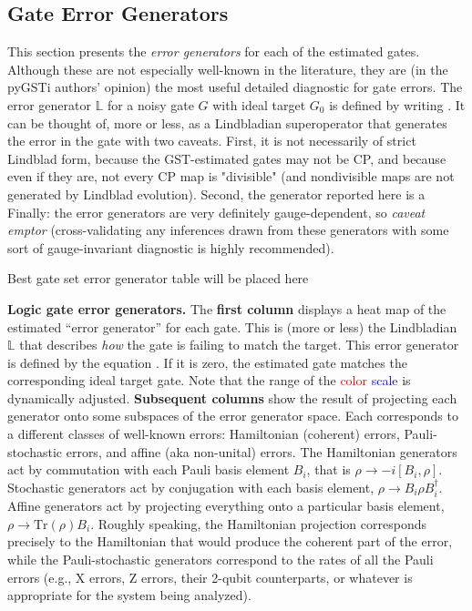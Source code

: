 \documentclass{article}[11pt]
\newcommand{\putfield}[2]{#2}
\begin{document}
{\subsection{Gate Error Generators}
This section presents the \emph{error generators} for each of the estimated gates.  Although these are not especially well-known in the literature, they are (in the pyGSTi authors' opinion) the most useful detailed diagnostic for gate errors.  The error generator $\mathbb{L}$ for a noisy gate $G$ with ideal target $G_0$ is defined by writing \errorgenformula.  It can be thought of, more or less, as a Lindbladian superoperator that generates the error in the gate \textendash with two caveats.  First, it is not necessarily of strict Lindblad form, because the GST-estimated gates may not be CP, and because even if they are, not every CP map is "divisible" (and nondivisible maps are not generated by Lindblad evolution).  Second, the generator reported here is a \errorgendescription  Finally:  the error generators are very definitely gauge-dependent, so \emph{caveat emptor} (cross-validating any inferences drawn from these generators with some sort of gauge-invariant diagnostic is highly recommended).

\begin{table}[h]
  \begin{center}
    \begin{adjustbox}{max width=\textwidth}
      \putfield{final_model_errorgen_box_table}{Best gate set error generator table will be placed here}
    \end{adjustbox}
    \caption{\textbf{Logic gate error generators.} The \textbf{first column} displays a heat map of the estimated ``error generator'' for each gate.  This is (more or less) the Lindbladian $\mathbb{L}$ that describes \emph{how} the gate is failing to match the target.  This error generator is defined by the equation \errorgenformula. If it is zero, the estimated gate matches the corresponding ideal target gate.  Note that the range of the \textcolor{red}{color} \textcolor{blue}{scale} is dynamically adjusted. \textbf{Subsequent columns} show the result of projecting each generator onto some subspaces of the error generator space.  Each corresponds to a different classes of well-known errors:  Hamiltonian (coherent) errors, Pauli-stochastic errors, and affine (aka non-unital) errors.  The Hamiltonian generators act by commutation with each Pauli basis element $B_i$, that is $\rho \rightarrow -i[B_i, \rho]$.  Stochastic generators act by conjugation with each basis element, $\rho \rightarrow B_i \rho B_i^\dagger$.  Affine generators act by projecting everything onto a particular basis element, $\rho \rightarrow \mathrm{Tr}(\rho) B_i$.  Roughly speaking, the Hamiltonian projection corresponds precisely to the Hamiltonian that would produce the coherent part of the error, while the Pauli-stochastic generators correspond to the rates of all the Pauli errors (e.g., X errors, Z errors, their 2-qubit counterparts, or whatever is appropriate for the system being analyzed).\label{bestGatesetErrGenTable}}
  \end{center}
\end{table}

}{} %
\end{document}
